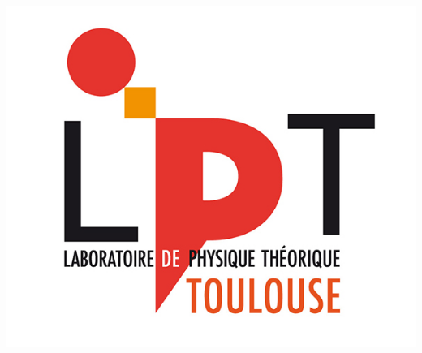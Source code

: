 \begin{frame}
\begin{columns}
\begin{column}{2cm}
\includegraphics[scale=.15]{img/title/LPT-LOGO_RVB.jpg}
\end{column}
\end{columns}
\end{frame}
